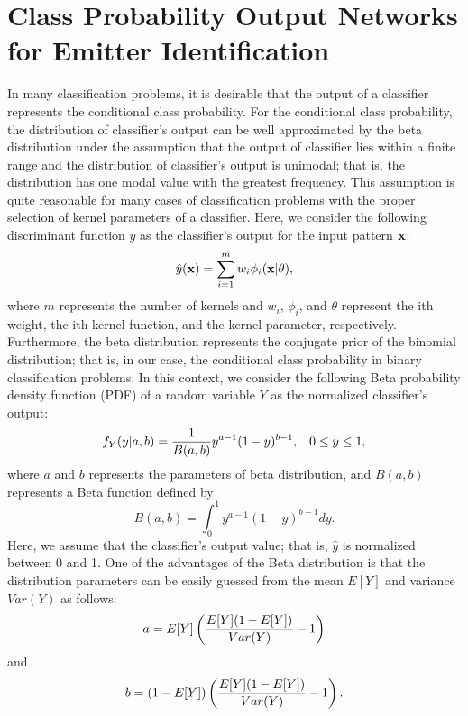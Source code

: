 \documentclass[runningheads,a4paper]{llncs}
\begin{document}
\newpage
\section{Class Probability Output Networks for Emitter Identification}

In many classification problems, it is desirable that the output of a classifier represents the conditional class probability.
For the conditional class probability, the distribution of classifier's output can be well approximated by the beta distribution under
the assumption that the output of classifier lies within a finite range and the distribution of classifier's output is unimodal; that is,
the distribution has one modal value with the greatest frequency. This assumption is quite reasonable for many cases of classification problems
with the proper selection of kernel parameters of a classifier.
Here, we consider the following discriminant function $y$ as the classifier's output for the input pattern $\bf x$:
\begin{equation}
\hat{y}({\bf x})=\sum_{i=1}^m w_i\phi_i({\bf x}|\theta),
\label{y_hat}
\end{equation}
where $m$ represents the number of kernels and $w_i$, $\phi_i$, and $\theta$ represent the ith weight, the ith kernel function,
and the kernel parameter, respectively.  Furthermore, the beta distribution represents the conjugate prior of the binomial distribution; that is,
in our case, the conditional class probability in binary classification problems.
In this context, we consider the following Beta probability density function (PDF) of a random variable $Y$ as the normalized classifier's output:
\begin{equation}
f_Y(y|a,b)={1\over{B(a,b)}}y^{a-1}(1-y)^{b-1}, \;\;\; 0\le y\le 1,
\end{equation}
where $a$ and $b$ represents the parameters of beta distribution, and $B(a,b)$ represents a Beta function defined by
\begin{equation}
B(a,b)=\int_0^1 y^{a-1}(1-y)^{b-1}dy.
\end{equation}
Here, we assume that the classifier's output value; that is, $\hat{y}$ is normalized between 0 and 1.
One of the advantages of the Beta distribution is that the distribution parameters can be easily guessed from the mean $E[Y]$
and variance $Var(Y)$ as follows:
\begin{equation}
a=E[Y]\left( {{E[Y](1-E[Y])}\over{Var(Y)}}-1\right)
\end{equation}
and	
\begin{equation}
b=(1-E[Y])\left( {{E[Y](1-E[Y])}\over{Var(Y)}}-1\right).
\end{equation}
\end{document}
